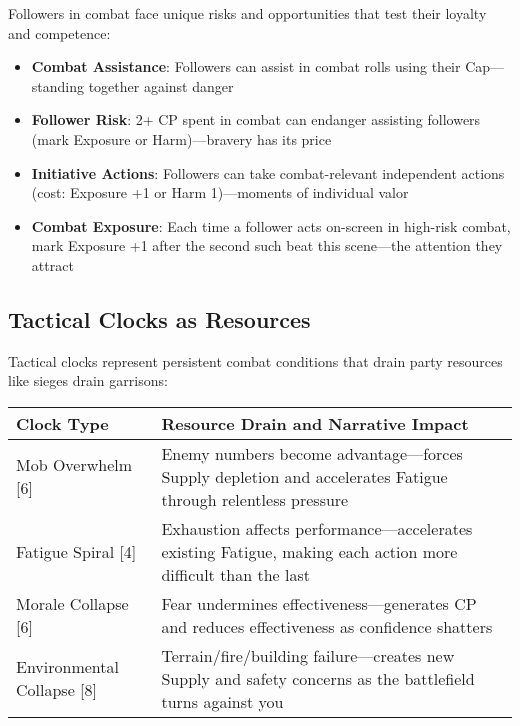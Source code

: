Followers in combat face unique risks and opportunities that test their loyalty and competence:

\begin{itemize}
    \item \textbf{Combat Assistance}: Followers can assist in combat rolls using their Cap—standing together against danger
    \item \textbf{Follower Risk}: 2+ CP spent in combat can endanger assisting followers (mark Exposure or Harm)—bravery has its price
    \item \textbf{Initiative Actions}: Followers can take combat-relevant independent actions (cost: Exposure +1 or Harm 1)—moments of individual valor
    \item \textbf{Combat Exposure}: Each time a follower acts on-screen in high-risk combat, mark Exposure +1 after the second such beat this scene—the attention they attract
\end{itemize}

\subsection*{Tactical Clocks as Resources}

Tactical clocks represent persistent combat conditions that drain party resources like sieges drain garrisons:

\begin{fatebox}
\begin{tabularx}{\textwidth}{lX}
\toprule
\textbf{Clock Type} & \textbf{Resource Drain and Narrative Impact} \\
\midrule
Mob Overwhelm [6] & Enemy numbers become advantage—forces Supply depletion and accelerates Fatigue through relentless pressure \\
Fatigue Spiral [4] & Exhaustion affects performance—accelerates existing Fatigue, making each action more difficult than the last \\
Morale Collapse [6] & Fear undermines effectiveness—generates CP and reduces effectiveness as confidence shatters \\
Environmental Collapse [8] & Terrain/fire/building failure—creates new Supply and safety concerns as the battlefield turns against you \\
\bottomrule
\end{tabularx}
\end{fatebox}

